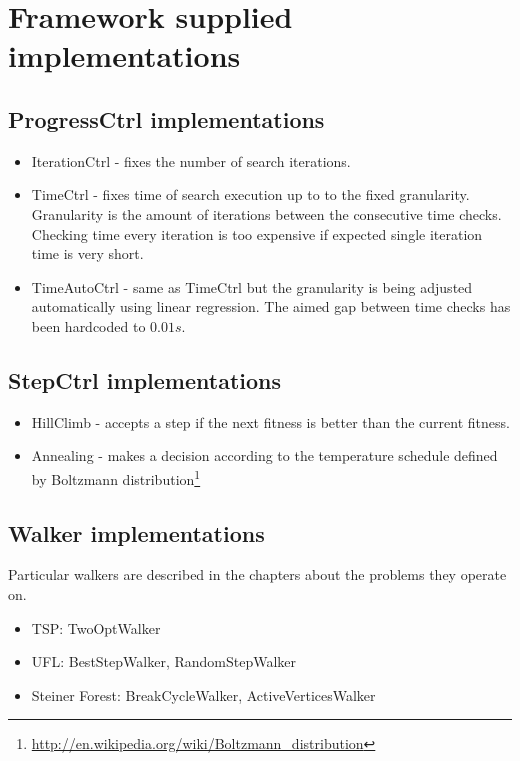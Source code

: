 \section{Framework supplied implementations}

\subsection{ProgressCtrl implementations}
\begin{itemize}
\item IterationCtrl - fixes the number of search iterations.
\item TimeCtrl - fixes time of search execution up to to the fixed granularity.
	Granularity is the amount of iterations between the consecutive time checks.
	Checking time every iteration is too expensive if expected single iteration time
	is very short.
\item TimeAutoCtrl - same as TimeCtrl but the granularity is being adjusted
	automatically using linear regression. The aimed gap between time checks has
	been hardcoded to $0.01s$.
\end{itemize}

\subsection{StepCtrl implementations}
\begin{itemize}
\item HillClimb - accepts a step if the next fitness is better than the current fitness.
\item Annealing - makes a decision according to the temperature schedule defined by
	Boltzmann distribution\footnote{\url{http://en.wikipedia.org/wiki/Boltzmann_distribution}}
\end{itemize}

\subsection{Walker implementations}
Particular walkers are described in the chapters about the problems they operate on.
\begin{itemize}
\item TSP: TwoOptWalker
\item UFL: BestStepWalker, RandomStepWalker
\item Steiner Forest: BreakCycleWalker, ActiveVerticesWalker
\end{itemize}

